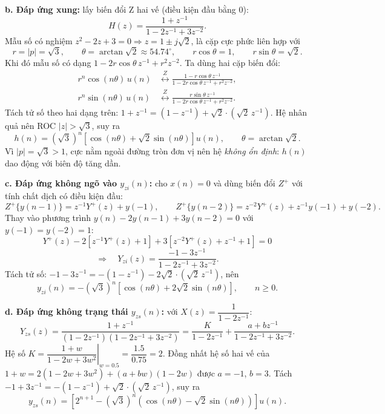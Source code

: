 \documentclass[12pt,a4paper]{article}
\newcommand{\zpair}{\overset{Z}{\longleftrightarrow}}
\begin{document}
\textbf{b. Đáp ứng xung:} lấy biến đổi Z hai vế (điều kiện đầu bằng 0):
\[
    H(z) = \frac{1 + z^{-1}}{1 - 2z^{-1} + 3z^{-2}}.
\]
Mẫu số có nghiệm $z^2 - 2z + 3 = 0 \Rightarrow z = 1 \pm j\sqrt{2}$, là cặp cực phức liên hợp với
\[
    r = |p| = \sqrt{3}, \qquad \theta = \arctan\sqrt{2} \approx 54.74^\circ, \qquad r\cos\theta = 1, \qquad r\sin\theta = \sqrt{2}.
\]
Khi đó mẫu số có dạng $1 - 2r\cos\theta\, z^{-1} + r^2 z^{-2}$. Ta dùng hai cặp biến đổi:
\begin{align*}
    r^n \cos(n\theta)\, u(n) &\zpair \frac{1 - r\cos\theta\, z^{-1}}{1 - 2r\cos\theta\, z^{-1} + r^2 z^{-2}}, \\
    r^n \sin(n\theta)\, u(n) &\zpair \frac{r\sin\theta\, z^{-1}}{1 - 2r\cos\theta\, z^{-1} + r^2 z^{-2}}.
\end{align*}
Tách tử số theo hai dạng trên: $1 + z^{-1} = (1 - z^{-1}) + \sqrt{2} \cdot \left(\sqrt{2}\, z^{-1}\right)$. Hệ nhân quả nên ROC $|z| > \sqrt{3}$, suy ra
\begin{equation}
    h(n) = (\sqrt{3})^n \left[\cos(n\theta) + \sqrt{2}\sin(n\theta)\right] u(n), \qquad \theta = \arctan\sqrt{2}.
\end{equation}
Vì $|p| = \sqrt{3} > 1$, cực nằm ngoài đường tròn đơn vị nên hệ \emph{không ổn định}: $h(n)$ dao động với biên độ tăng dần.

\textbf{c. Đáp ứng không ngõ vào $y_{zi}(n)$:} cho $x(n) = 0$ và dùng biến đổi $Z^+$ với tính chất dịch có điều kiện đầu:
\[
    Z^+\{y(n-1)\} = z^{-1}Y^+(z) + y(-1),
    \qquad
    Z^+\{y(n-2)\} = z^{-2}Y^+(z) + z^{-1}y(-1) + y(-2).
\]
Thay vào phương trình $y(n) - 2y(n-1) + 3y(n-2) = 0$ với $y(-1) = y(-2) = 1$:
\[
    Y^+(z) - 2\left[z^{-1}Y^+(z) + 1\right] + 3\left[z^{-2}Y^+(z) + z^{-1} + 1\right] = 0
\]
\[
    \Longrightarrow\quad
    Y_{zi}(z) = \frac{-1 - 3z^{-1}}{1 - 2z^{-1} + 3z^{-2}}.
\]
Tách tử số: $-1 - 3z^{-1} = -(1 - z^{-1}) - 2\sqrt{2} \cdot \left(\sqrt{2}\, z^{-1}\right)$, nên
\begin{equation}
    y_{zi}(n) = -(\sqrt{3})^n \left[\cos(n\theta) + 2\sqrt{2}\sin(n\theta)\right], \qquad n \ge 0.
\end{equation}

\textbf{d. Đáp ứng không trạng thái $y_{zs}(n)$:} với $X(z) = \dfrac{1}{1 - 2z^{-1}}$:
\[
    Y_{zs}(z) = \frac{1 + z^{-1}}{(1 - 2z^{-1})(1 - 2z^{-1} + 3z^{-2})} = \frac{K}{1 - 2z^{-1}} + \frac{a + bz^{-1}}{1 - 2z^{-1} + 3z^{-2}}.
\]
Hệ số $K = \left.\dfrac{1 + w}{1 - 2w + 3w^2}\right|_{w = 0.5} = \dfrac{1.5}{0.75} = 2$. Đồng nhất hệ số hai vế của $1 + w = 2(1 - 2w + 3w^2) + (a + bw)(1 - 2w)$ được $a = -1$, $b = 3$. Tách $-1 + 3z^{-1} = -(1 - z^{-1}) + \sqrt{2} \cdot \left(\sqrt{2}\, z^{-1}\right)$, suy ra
\begin{equation}
    y_{zs}(n) = \left[2^{n+1} - (\sqrt{3})^n \left(\cos(n\theta) - \sqrt{2}\sin(n\theta)\right)\right] u(n).
\end{equation}
\end{document}
